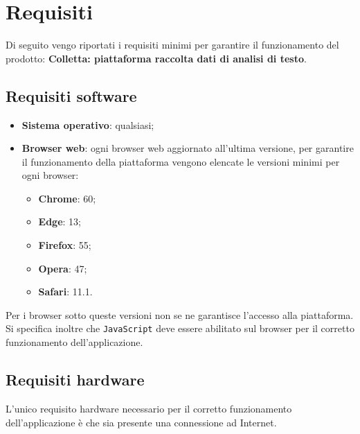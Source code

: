 \section{Requisiti}

    Di seguito vengo riportati i requisiti minimi per garantire il funzionamento del prodotto: 
\textbf{Colletta: piattaforma raccolta dati di analisi di testo}. 


\subsection{Requisiti software}
\begin{itemize}
\item \textbf{Sistema operativo}: qualsiasi;
\item \textbf{Browser web}: ogni browser web aggiornato all'ultima versione, per garantire il funzionamento della piattaforma vengono elencate le versioni minimi per ogni browser:
	\begin{itemize}
		\item \textbf{Chrome}: 60;
		\item \textbf{Edge}: 13;
		\item \textbf{Firefox}: 55;
		\item \textbf{Opera}: 47;
		\item \textbf{Safari}: 11.1.
	\end{itemize}
\end{itemize}

Per i browser sotto queste versioni non se ne garantisce l'accesso alla piattaforma. Si specifica inoltre che \texttt{JavaScript} deve essere abilitato sul browser per il corretto funzionamento dell'applicazione.

\subsection{Requisiti hardware}
L'unico requisito hardware necessario per il corretto funzionamento dell'applicazione è che sia presente una connessione ad Internet. 
\newpage
